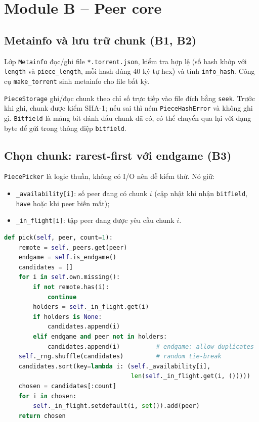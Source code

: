 \documentclass[12pt,a4paper,oneside]{report}
\begin{document}
\section{Module B -- Peer core}

\subsection{Metainfo và lưu trữ chunk (B1, B2)}
Lớp \texttt{Metainfo} đọc/ghi file \texttt{*.torrent.json}, kiểm tra hợp lệ (số hash khớp với \texttt{length} và \texttt{piece\_length}, mỗi hash đúng 40 ký tự hex) và tính \texttt{info\_hash}. Công cụ \texttt{make\_torrent} sinh metainfo cho file bất kỳ.

\texttt{PieceStorage} ghi/đọc chunk theo chỉ số trực tiếp vào file đích bằng \texttt{seek}. Trước khi ghi, chunk được kiểm SHA-1; nếu sai thì ném \texttt{PieceHashError} và không ghi gì. \texttt{Bitfield} là mảng bit đánh dấu chunk đã có, có thể chuyển qua lại với dạng byte để gửi trong thông điệp \texttt{bitfield}.

\subsection{Chọn chunk: rarest-first với endgame (B3)}
\texttt{PiecePicker} là logic thuần, không có I/O nên dễ kiểm thử. Nó giữ:
\begin{itemize}
  \item \texttt{\_availability[i]}: số peer đang có chunk $i$ (cập nhật khi nhận \texttt{bitfield}, \texttt{have} hoặc khi peer biến mất);
  \item \texttt{\_in\_flight[i]}: tập peer đang được yêu cầu chunk $i$.
\end{itemize}

\begin{lstlisting}[language=Python]
def pick(self, peer, count=1):
    remote = self._peers.get(peer)
    endgame = self.is_endgame()
    candidates = []
    for i in self.own.missing():
        if not remote.has(i):
            continue
        holders = self._in_flight.get(i)
        if holders is None:
            candidates.append(i)
        elif endgame and peer not in holders:
            candidates.append(i)          # endgame: allow duplicates
    self._rng.shuffle(candidates)         # random tie-break
    candidates.sort(key=lambda i: (self._availability[i],
                                   len(self._in_flight.get(i, ()))))
    chosen = candidates[:count]
    for i in chosen:
        self._in_flight.setdefault(i, set()).add(peer)
    return chosen
\end{lstlisting}
\end{document}

